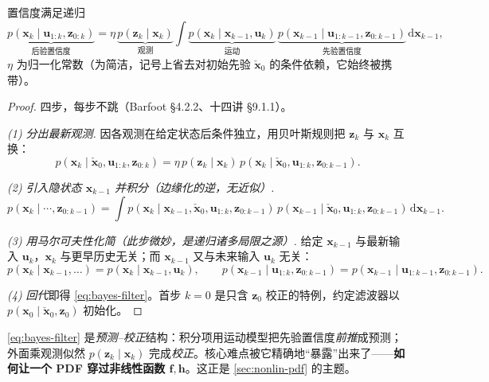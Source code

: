 \begin{theorem}[贝叶斯滤波]\label{thm:bayes-filter}
置信度满足递归
\begin{equation}
  \underbrace{p(\mathbf{x}_k\mid\mathbf{u}_{1:k},\mathbf{z}_{0:k})}_{\text{后验置信度}}
  =\eta\,\underbrace{p(\mathbf{z}_k\mid\mathbf{x}_k)}_{\text{观测}}
  \int \underbrace{p(\mathbf{x}_k\mid\mathbf{x}_{k-1},\mathbf{u}_k)}_{\text{运动}}\,
  \underbrace{p(\mathbf{x}_{k-1}\mid\mathbf{u}_{1:k-1},\mathbf{z}_{0:k-1})}_{\text{先验置信度}}\,\mathrm{d}\mathbf{x}_{k-1},
  \label{eq:bayes-filter}
\end{equation}
$\eta$ 为归一化常数（为简洁，记号上省去对初始先验 $\check{\mathbf{x}}_0$ 的条件依赖，它始终被携带）。
\end{theorem}
\begin{proof}
四步，每步不跳（Barfoot\cite{barfoot2024state} §4.2.2、十四讲\cite{gaoxiang2019slam14} §9.1.1）。

\emph{(1) 分出最新观测.} 因各观测在给定状态后条件独立，用贝叶斯规则把 $\mathbf{z}_k$ 与 $\mathbf{x}_k$ 互换：
\[
  p(\mathbf{x}_k\mid\check{\mathbf{x}}_0,\mathbf{u}_{1:k},\mathbf{z}_{0:k})
  =\eta\,p(\mathbf{z}_k\mid\mathbf{x}_k)\,p(\mathbf{x}_k\mid\check{\mathbf{x}}_0,\mathbf{u}_{1:k},\mathbf{z}_{0:k-1}).
\]

\emph{(2) 引入隐状态 $\mathbf{x}_{k-1}$ 并积分（边缘化的逆，无近似）.}
\[
  p(\mathbf{x}_k\mid\cdots,\mathbf{z}_{0:k-1})
  =\int p(\mathbf{x}_k\mid\mathbf{x}_{k-1},\check{\mathbf{x}}_0,\mathbf{u}_{1:k},\mathbf{z}_{0:k-1})\,
   p(\mathbf{x}_{k-1}\mid\check{\mathbf{x}}_0,\mathbf{u}_{1:k},\mathbf{z}_{0:k-1})\,\mathrm{d}\mathbf{x}_{k-1}.
\]

\emph{(3) 用马尔可夫性化简（此步微妙，是递归诸多局限之源）.} 给定 $\mathbf{x}_{k-1}$ 与最新输入 $\mathbf{u}_k$，$\mathbf{x}_k$ 与更早历史无关；而 $\mathbf{x}_{k-1}$ 又与未来输入 $\mathbf{u}_k$ 无关：
\[
  p(\mathbf{x}_k\mid\mathbf{x}_{k-1},\dots)=p(\mathbf{x}_k\mid\mathbf{x}_{k-1},\mathbf{u}_k),\qquad
  p(\mathbf{x}_{k-1}\mid\mathbf{u}_{1:k},\mathbf{z}_{0:k-1})=p(\mathbf{x}_{k-1}\mid\mathbf{u}_{1:k-1},\mathbf{z}_{0:k-1}).
\]

\emph{(4) 回代}即得 \cref{eq:bayes-filter}。首步 $k=0$ 是只含 $\mathbf{z}_0$ 校正的特例，约定滤波器以 $p(\mathbf{x}_0\mid\check{\mathbf{x}}_0,\mathbf{z}_0)$ 初始化。
\end{proof}

\noindent \cref{eq:bayes-filter} 是\emph{预测–校正}结构：积分项用运动模型把先验置信度\emph{前推}成预测；外面乘观测似然 $p(\mathbf{z}_k\mid\mathbf{x}_k)$ 完成\emph{校正}。核心难点被它精确地“暴露”出来了——\textbf{如何让一个 PDF 穿过非线性函数 $\mathbf{f},\mathbf{h}$}。这正是 \cref{sec:nonlin-pdf} 的主题。


